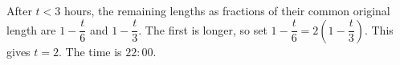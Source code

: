 After $t<3$ hours, the remaining lengths as fractions of their common original length are $1-\dfrac{t}{6}$ and $1-\dfrac{t}{3}$. The first is longer, so set $1-\dfrac{t}{6}=2(1-\dfrac{t}{3})$. This gives $t=2$. The time is $\boxed{22{:}00}$.
